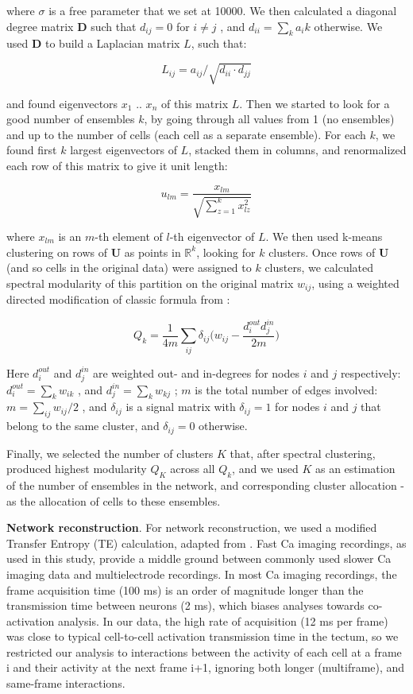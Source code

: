 \documentclass{article}
\begin{document}
where $\sigma$ is a free parameter that we set at 10000. We then calculated a diagonal degree matrix $\textbf{D}$ such that $d_{ij} = 0$ for $i \neq j$ , and $d_{ii} = \sum_k{a_ik}$ otherwise. We used $\textbf{D}$ to build a Laplacian matrix $L$, such that:

\[ L_{ij} = a_{ij}/\sqrt{d_{ii}\cdot d_{jj}} \]

and found eigenvectors $x_1$ .. $x_n$ of this matrix $L$. Then we started to look for a good number of ensembles $k$, by going through all values from 1 (no ensembles) and up to the number of cells (each cell as a separate ensemble). For each $k$, we found first $k$ largest eigenvectors of $L$, stacked them in columns, and renormalized each row of this matrix to give it unit length:

\[ u_{lm} = \frac{x_{lm}}{\sqrt{\sum_{z=1}^{k}{x_{lz}^2}}} \]

where $x_{lm}$ is an $m$-th element of $l$-th eigenvector of $L$. We then used k-means clustering on rows of $\textbf{U}$ as points in $\mathbb{R}^k$, looking for $k$ clusters. Once rows of $\textbf{U}$ (and so cells in the original data) were assigned to $k$ clusters, we calculated spectral modularity of this partition on the original matrix $w_{ij}$, using a weighted directed modification of classic formula from \citep{newman2006modularity}:

\[ Q_k = \frac{1}{4m}\sum_{ij}{\delta_{ij}\Big(w_{ij}-\frac{d^{out}_i d^{in}_j}{2m}}\Big) \]

Here $d^{out}_i$ and $d^{in}_j$ are weighted out- and in-degrees for nodes $i$ and $j$ respectively: $d^{out}_i = \sum_k{w_{ik}}$ , and $d^{in}_j = \sum_k{w_{kj}}$ ; $m$ is the total number of edges involved: $m = \sum_{ij}{w_{ij}}/2$ , and $\delta_{ij}$ is a signal matrix with $\delta_{ij}=1$ for nodes $i$ and $j$ that belong to the same cluster, and $\delta_{ij} = 0$ otherwise. 

Finally, we selected the number of clusters $K$ that, after spectral clustering, produced highest modularity $Q_K$ across all $Q_k$, and we used $K$ as an estimation of the number of ensembles in the network, and corresponding cluster allocation - as the allocation of cells to these ensembles.

\textbf{Network reconstruction}. For network reconstruction, we used a modified Transfer Entropy (TE) calculation, adapted from \citep{stetter2012te,gourevitch2007te}. Fast Ca imaging recordings, as used in this study, provide a middle ground between commonly used slower Ca imaging data and multielectrode recordings. In most Ca imaging recordings, the frame acquisition time (100 ms) is an order of magnitude longer than the transmission time between neurons (2 ms), which biases analyses towards co-activation analysis. In our data, the high rate of acquisition (12 ms per frame) was close to typical cell-to-cell activation transmission time in the tectum, so we restricted our analysis to interactions between the activity of each cell at a frame i and their activity at the next frame i+1, ignoring both longer (multiframe), and same-frame interactions.
\end{document}
